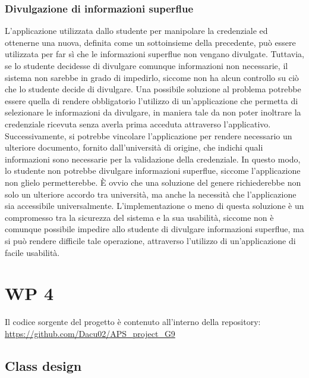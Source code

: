 \documentclass[a4paper,12pt]{article}
\begin{document}
\subsubsection{Divulgazione di informazioni superflue}
L'applicazione utilizzata dallo studente per manipolare la credenziale ed ottenerne una nuova, definita come un sottoinsieme della precedente, può essere utilizzata per far sì che le informazioni superflue non vengano divulgate. Tuttavia, se lo studente decidesse di divulgare comunque informazioni non necessarie, il sistema non sarebbe in grado di impedirlo, siccome non ha alcun controllo su ciò che lo studente decide di divulgare.
\newline Una possibile soluzione al problema potrebbe essere quella di rendere obbligatorio l'utilizzo di un'applicazione che permetta di selezionare le informazioni da divulgare, in maniera tale da non poter inoltrare la credenziale ricevuta senza averla prima acceduta attraverso l'applicativo. Successivamente, si potrebbe vincolare l'applicazione per rendere necessario un ulteriore documento, fornito dall'università di origine, che indichi quali informazioni sono necessarie per la validazione della credenziale. In questo modo, lo studente non potrebbe divulgare informazioni superflue, siccome l'applicazione non glielo permetterebbe.
\newline È ovvio che una soluzione del genere richiederebbe non solo un ulteriore accordo tra università, ma anche la necessità che l'applicazione sia accessibile universalmente. L'implementazione o meno di questa soluzione è un compromesso tra la sicurezza del sistema e la sua usabilità, siccome non è comunque possibile impedire allo studente di divulgare informazioni superflue, ma si può rendere difficile tale operazione, attraverso l'utilizzo di un'applicazione di facile usabilità.
\newpage
\section{WP 4}
Il codice sorgente del progetto è contenuto all'interno della repository: \newline\url{https://github.com/Dacu02/APS_project_G9}
\subsection{Class design}
\end{document}
